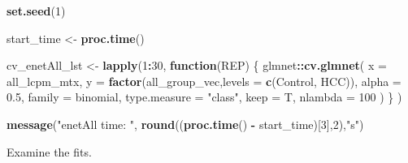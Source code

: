 \documentclass[
]{book}
\newenvironment{Shaded}{\begin{snugshade}}{\end{snugshade}}
\newcommand{\CommentTok}[1]{\textcolor[rgb]{0.56,0.35,0.01}{\textit{#1}}}
\newcommand{\ControlFlowTok}[1]{\textcolor[rgb]{0.13,0.29,0.53}{\textbf{#1}}}
\newcommand{\DataTypeTok}[1]{\textcolor[rgb]{0.13,0.29,0.53}{#1}}
\newcommand{\DecValTok}[1]{\textcolor[rgb]{0.00,0.00,0.81}{#1}}
\newcommand{\FloatTok}[1]{\textcolor[rgb]{0.00,0.00,0.81}{#1}}
\newcommand{\KeywordTok}[1]{\textcolor[rgb]{0.13,0.29,0.53}{\textbf{#1}}}
\newcommand{\NormalTok}[1]{#1}
\newcommand{\OperatorTok}[1]{\textcolor[rgb]{0.81,0.36,0.00}{\textbf{#1}}}
\newcommand{\StringTok}[1]{\textcolor[rgb]{0.31,0.60,0.02}{#1}}
\begin{document}
\begin{Shaded}
\begin{Highlighting}[]
\KeywordTok{set.seed}\NormalTok{(}\DecValTok{1}\NormalTok{)}

\NormalTok{start\_time <{-}}\StringTok{  }\KeywordTok{proc.time}\NormalTok{()}

\NormalTok{cv\_enetAll\_lst <{-}}\StringTok{ }\KeywordTok{lapply}\NormalTok{(}\DecValTok{1}\OperatorTok{:}\DecValTok{30}\NormalTok{, }\ControlFlowTok{function}\NormalTok{(REP) \{}
\NormalTok{glmnet}\OperatorTok{::}\KeywordTok{cv.glmnet}\NormalTok{(}
 \DataTypeTok{x =}\NormalTok{ all\_lcpm\_mtx,}
 \DataTypeTok{y =} \KeywordTok{factor}\NormalTok{(all\_group\_vec,}\DataTypeTok{levels =} \KeywordTok{c}\NormalTok{(}\StringTok{\textquotesingle{}Control\textquotesingle{}}\NormalTok{, }\StringTok{\textquotesingle{}HCC\textquotesingle{}}\NormalTok{)),}
 \DataTypeTok{alpha =} \FloatTok{0.5}\NormalTok{,}
 \DataTypeTok{family =} \StringTok{\textquotesingle{}binomial\textquotesingle{}}\NormalTok{,}
 \DataTypeTok{type.measure  =}  \StringTok{"class"}\NormalTok{,}
 \DataTypeTok{keep =}\NormalTok{ T,}
 \DataTypeTok{nlambda =} \DecValTok{100}
\NormalTok{)}
\NormalTok{\}}
\NormalTok{)}

\KeywordTok{message}\NormalTok{(}\StringTok{"enetAll time: "}\NormalTok{, }\KeywordTok{round}\NormalTok{((}\KeywordTok{proc.time}\NormalTok{() }\OperatorTok{{-}}\StringTok{ }\NormalTok{start\_time)[}\DecValTok{3}\NormalTok{],}\DecValTok{2}\NormalTok{),}\StringTok{"s"}\NormalTok{)}
\end{Highlighting}
\end{Shaded}

Examine the fits.

\begin{Shaded}
\end{Shaded}
\end{document}
